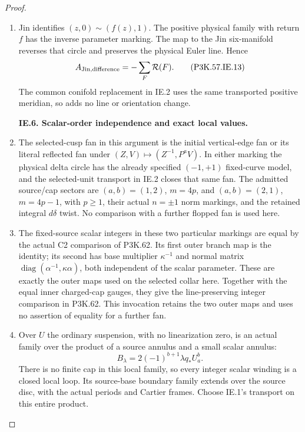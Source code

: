 \begin{proof}
\begin{enumerate}[label=\arabic*.]
\item Jin identifies \((z,0)\sim(f(z),1)\).
The positive physical family with return
\(f\) has the inverse parameter marking.
The map to the Jin six-manifold reverses
that circle and preserves the physical
Euler line. Hence
\[
                  A_{\rm Jin,difference}
                           =-\sum_F\mathcal R(F).         \tag{P3K.57.IE.13}
\]
The common conifold replacement in IE.2
uses the same transported positive
meridian, so adds no line or orientation
change.

\par\medskip\noindent\textbf{IE.6. Scalar-order independence and exact local values.}\par\nopagebreak[4]

\item The selected-cusp fan in this argument is the initial
vertical-edge fan or its literal reflected fan under
\((Z,V)\mapsto(Z^{-1},P^aV)\). In either marking the
physical delta circle has the already specified
\((-1,+1)\) fixed-curve model, and the selected-unit
transport in IE.2 closes that same fan. The admitted
source/cap sectors are \((a,b)=(1,2)\), \(m=4p\),
and \((a,b)=(2,1)\), \(m=4p-1\), with \(p\ge1\),
their actual \(n=\pm1\) norm markings, and the
retained integral \(d\delta\) twist. No comparison
with a further flopped fan is used here.

\item The fixed-source scalar integers in these two particular markings
are equal by the actual C2 comparison of P3K.62. Its first outer
branch map is the identity; its second has base multiplier
\(\kappa^{-1}\) and normal matrix
\(\operatorname{diag}(\alpha^{-1},\kappa\alpha)\), both independent
of the scalar parameter. These are exactly the outer maps used
on the selected collar here. Together with the equal inner
charged-cap gauges, they give the line-preserving integer
comparison in P3K.62. This invocation retains the two outer
maps and uses no assertion of equality for a further fan.

\item Over \(U\) the ordinary suspension, with
no linearization zero, is an actual family
over the product of a source annulus and
a small scalar annulus:
\[
                   B_\lambda=2(-1)^{b+1}\lambda q_*U_a^b.
\]
There is no finite cap in this local
family, so every integer scalar winding
is a closed local loop. Its source-base
boundary family extends over the source
disc, with the actual periods and Cartier
frames. Choose IE.1's transport on this
entire product.


\end{enumerate}
\end{proof}

